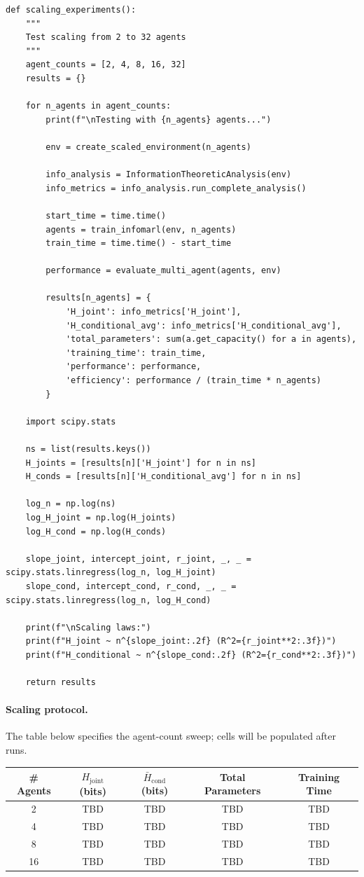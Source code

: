 \documentclass[10pt, letterpaper]{article}
\begin{document}
\begin{lstlisting}
def scaling_experiments():
    """
    Test scaling from 2 to 32 agents
    """
    agent_counts = [2, 4, 8, 16, 32]
    results = {}

    for n_agents in agent_counts:
        print(f"\nTesting with {n_agents} agents...")

        env = create_scaled_environment(n_agents)

        info_analysis = InformationTheoreticAnalysis(env)
        info_metrics = info_analysis.run_complete_analysis()

        start_time = time.time()
        agents = train_infomarl(env, n_agents)
        train_time = time.time() - start_time

        performance = evaluate_multi_agent(agents, env)

        results[n_agents] = {
            'H_joint': info_metrics['H_joint'],
            'H_conditional_avg': info_metrics['H_conditional_avg'],
            'total_parameters': sum(a.get_capacity() for a in agents),
            'training_time': train_time,
            'performance': performance,
            'efficiency': performance / (train_time * n_agents)
        }

    import scipy.stats

    ns = list(results.keys())
    H_joints = [results[n]['H_joint'] for n in ns]
    H_conds = [results[n]['H_conditional_avg'] for n in ns]

    log_n = np.log(ns)
    log_H_joint = np.log(H_joints)
    log_H_cond = np.log(H_conds)

    slope_joint, intercept_joint, r_joint, _, _ = scipy.stats.linregress(log_n, log_H_joint)
    slope_cond, intercept_cond, r_cond, _, _ = scipy.stats.linregress(log_n, log_H_cond)

    print(f"\nScaling laws:")
    print(f"H_joint ~ n^{slope_joint:.2f} (R^2={r_joint**2:.3f})")
    print(f"H_conditional ~ n^{slope_cond:.2f} (R^2={r_cond**2:.3f})")

    return results
\end{lstlisting}

\paragraph{Scaling protocol.} The table below specifies the agent-count sweep; cells will be populated after runs.

\begin{center}
\begin{tabular}{ccccc}
\toprule
\textbf{\# Agents} & \textbf{$H_\text{joint}$ (bits)} & \textbf{$\bar{H}_\text{cond}$ (bits)} & \textbf{Total Parameters} & \textbf{Training Time} \\
\midrule
2  & TBD & TBD & TBD & TBD \\
4  & TBD & TBD & TBD & TBD \\
8  & TBD & TBD & TBD & TBD \\
16 & TBD & TBD & TBD & TBD \\
\bottomrule
\end{tabular}
\end{center}
\end{document}
